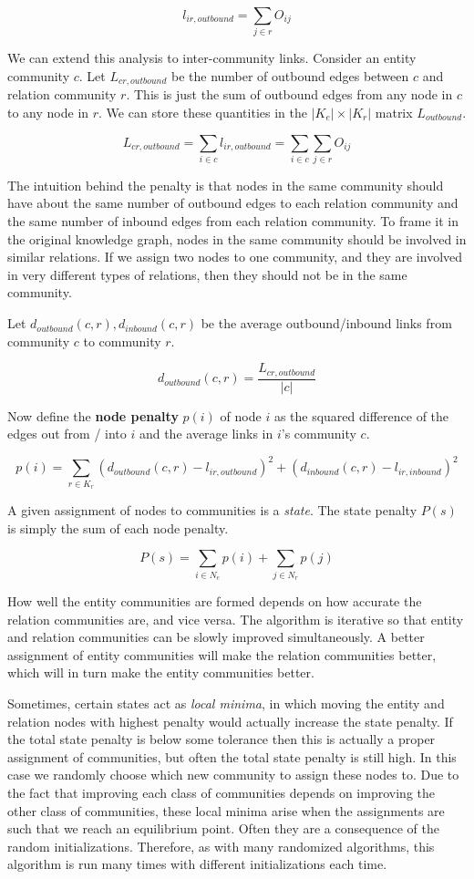 \documentclass[12pt]{article}
\begin{document}
$$l_{ir, outbound} = \sum_{j \in r} O_{ij}$$

We can extend this analysis to inter-community links. Consider an entity
community $c$. Let $L_{cr,outbound}$ be the number of outbound edges between $c$
and relation community $r$. This is just the sum of outbound edges from any node
in $c$ to any node in $r$. We can store these quantities in the $|K_e|\times
|K_r|$ matrix $L_{outbound}$.

$$L_{cr, outbound} = \sum_{i \in c} l_{ir, outbound} = \sum_{i \in c} \sum_{j \in r} O_{ij} $$

The intuition behind the penalty is that nodes in the same community should have
about the same number of outbound edges to each relation community and the same
number of inbound edges from each relation community. To frame it in the original
knowledge graph, nodes in the same community should be involved in similar relations.
If we assign two nodes to one community, and they are involved in very different
types of relations, then they should not be in the same community.

Let $d_{outbound}(c,r), d_{inbound}(c,r)$ be the average outbound/inbound links
from community $c$ to community $r$.

$$d_{outbound}(c,r) = \frac{L_{cr, outbound}}{|c|}$$

Now define the \textbf{node penalty} $p(i)$ of node $i$ as the squared difference
of the edges out from / into $i$ and the average links in $i$'s community $c$.

$$p(i) = \sum_{r \in K_r} (d_{outbound}(c,r) - l_{ir,outbound})^2 +
(d_{inbound}(c,r) - l_{ir, inbound})^2 $$

A given assignment of nodes to communities is a \textit{state}. The state penalty
$P(s)$ is simply the sum of each node penalty.

$$P(s) = \sum_{i \in N_e} p(i) + \sum_{j \in N_r} p(j)$$

How well the entity communities are formed depends on how accurate the relation
communities are, and vice versa. The algorithm is iterative so that entity and
relation communities can be slowly improved simultaneously. A better assignment
of entity communities will make the relation communities better, which will in
turn make the entity communities better.

Sometimes, certain states act as \textit{local minima}, in which moving the
entity and relation nodes with highest penalty would actually increase the state
penalty. If the total state penalty is below some tolerance then this is
actually a proper assignment of communities, but often the total state penalty
is still high. In this case we randomly choose which new community to assign
these nodes to. Due to the fact that improving each class of communities depends
on improving the other class of communities, these local minima arise when the
assignments are such that we reach an equilibrium point. Often they are a
consequence of the random initializations. Therefore, as with many randomized
algorithms, this algorithm is run many times with different initializations each
time.
\end{document}
